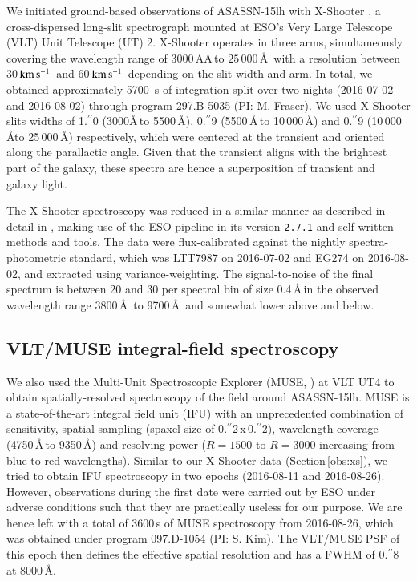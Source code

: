 \documentclass[traditabstract]{aa}
\newcommand{\farc}{\hbox{$.\!\!^{\prime\prime}$}}
\newcommand{\kms}{$\rm{km\,s^{-1}}$}
\begin{document}
We initiated ground-based observations of ASASSN-15lh with X-Shooter \citep{2011A&A...536A.105V}, a cross-dispersed long-slit spectrograph mounted at ESO's Very Large Telescope (VLT) Unit Telescope (UT) 2. X-Shooter operates in three arms, simultaneously covering the wavelength range of $3000$\,AA\,to $25\,000$\,\AA\, with a resolution between 30\,\kms\, and 60\,\kms\, depending on the slit width and arm. In total, we obtained approximately 5700~s of integration split over two nights (2016-07-02 and 2016-08-02) through program 297.B-5035 (PI: M. Fraser). We used X-Shooter slits widths of 1\farc{0} (3000\AA\,to 5500\,\AA), 0\farc{9} (5500\,\AA\,to 10\,000\,\AA) and  0\farc{9} (10\,000\,\AA to 25\,000\,\AA) respectively, which were centered at the transient and oriented along the parallactic angle. Given that the transient aligns with the brightest part of the galaxy, these spectra are hence a superposition of transient and galaxy light.

The X-Shooter spectroscopy was reduced in a similar manner as described in detail in \citet{2015A&A...581A.125K}, making use of the ESO pipeline in its version \texttt{2.7.1} \citep{2006SPIE.6269E..80G, 2010SPIE.7737E..56M} and self-written methods and tools. The data were flux-calibrated against the nightly spectra-photometric standard, which was LTT7987 on 2016-07-02 and EG274 on 2016-08-02, and extracted using variance-weighting. The signal-to-noise of the final spectrum is between 20 and 30 per spectral bin of size 0.4\,\AA\,in the observed wavelength range 3800\,\AA\, to 9700\,\AA\, and somewhat lower above and below.

\subsection{VLT/MUSE integral-field spectroscopy}
\label{obs:muse}

We also used the Multi-Unit Spectroscopic Explorer (MUSE, \citealt{2010SPIE.7735E..08B}) at VLT UT4 to obtain spatially-resolved spectroscopy of the field around ASASSN-15lh. MUSE is a state-of-the-art integral field unit (IFU) with an unprecedented combination of sensitivity, spatial sampling (spaxel size of 0\farc{2}\,x\,0\farc{2}), wavelength coverage (4750\,\AA\,to 9350\,\AA) and resolving power ($R=1500$ to $R=3000$ increasing from blue to red wavelengths). Similar to our X-Shooter data (Section\,\ref{obs:xs}), we tried to obtain IFU spectroscopy in two epochs (2016-08-11 and 2016-08-26). However, observations during the first date were carried out by ESO under adverse conditions such that they are practically useless for our purpose. We are hence left with a total of 3600\,s of MUSE spectroscopy from 2016-08-26, which was obtained under program 097.D-1054 (PI: S. Kim). The VLT/MUSE PSF of this epoch then defines the effective spatial resolution and has a FWHM of 0\farc{8} at 8000\,\AA.
\end{document}

